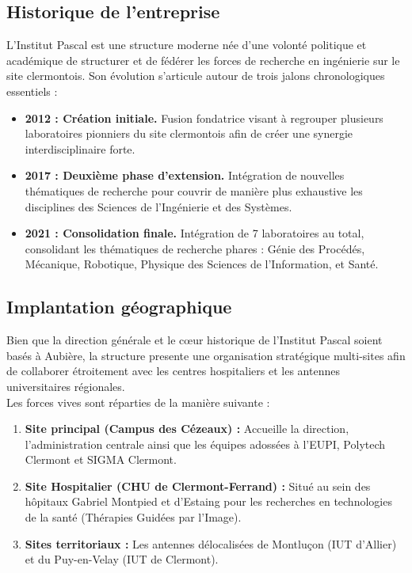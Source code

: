 \documentclass[12pt,a4paper,oneside]{report}
\begin{document}
\subsection{Historique de l'entreprise}
L'Institut Pascal est une structure moderne née d'une volonté politique et académique de structurer et de fédérer les forces de recherche en ingénierie sur le site clermontois. Son évolution s'articule autour de trois jalons chronologiques essentiels :
\begin{itemize}
    \item \textbf{2012 : Création initiale.} Fusion fondatrice visant à regrouper plusieurs laboratoires pionniers du site clermontois afin de créer une synergie interdisciplinaire forte.
    \item \textbf{2017 : Deuxième phase d'extension.} Intégration de nouvelles thématiques de recherche pour couvrir de manière plus exhaustive les disciplines des Sciences de l'Ingénierie et des Systèmes.
    \item \textbf{2021 : Consolidation finale.} Intégration de 7 laboratoires au total, consolidant les thématiques de recherche phares : Génie des Procédés, Mécanique, Robotique, Physique des Sciences de l'Information, et Santé.
\end{itemize}

\subsection{Implantation géographique}
Bien que la direction générale et le cœur historique de l'Institut Pascal soient basés à Aubière, la structure presente une organisation stratégique multi-sites afin de collaborer étroitement avec les centres hospitaliers et les antennes universitaires régionales.\\
Les forces vives sont réparties de la manière suivante :
\begin{enumerate}
    \item \textbf{Site principal (Campus des Cézeaux) :} Accueille la direction, l'administration centrale ainsi que les équipes adossées à l'EUPI, Polytech Clermont et SIGMA Clermont.
    \item \textbf{Site Hospitalier (CHU de Clermont-Ferrand) :} Situé au sein des hôpitaux Gabriel Montpied et d'Estaing pour les recherches en technologies de la santé (Thérapies Guidées par l'Image).
    \item \textbf{Sites territoriaux :} Les antennes délocalisées de Montluçon (IUT d'Allier) et du Puy-en-Velay (IUT de Clermont).
\end{enumerate}
\end{document}
